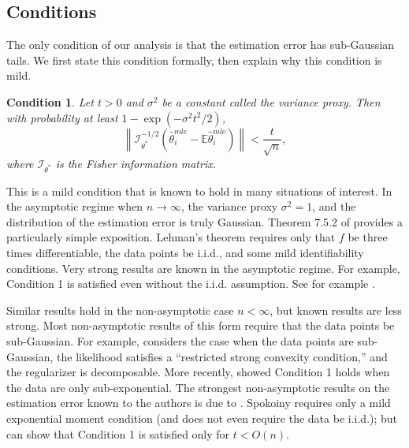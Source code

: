 \documentclass[twoside]{article}
\newtheorem{assumption}{Condition}
\newcommand{\E}{\mathbb{E}}
\newcommand{\w}{\theta}
\newcommand{\wmle}{\hat\w^{mle}}
\newcommand{\wstar}{{\w^{*}}}
\newcommand{\I}{\mathcal I}
\newcommand{\ltwo}[1]{{\lVert {#1} \rVert}}
\newcommand{\ltwobig}[1]{{\left\lVert {#1} \right\rVert}}
\newcommand{\prob}[1]{\Pr\left[{#1}\right]}
\begin{document}
\subsection{Conditions}

The only condition of our analysis is that the estimation error has sub-Gaussian tails.
We first state this condition formally,
then explain why this condition is mild.

\begin{assumption}
Let $t>0$ and $\sigma^2$ be a constant called the \emph{variance proxy}.
Then with probability at least $1-\exp(-\sigma^2t^2/2)$,
\begin{equation}
\ltwobig{\I^{-1/2}_\wstar(\wmle_i-\E\wmle_i)} < \frac{t}{\sqrt n}
,
\end{equation}
where $\I_\wstar$ is the Fisher information matrix.
\end{assumption}

This is a mild condition that is known to hold in many situations of interest.
In the asymptotic regime when $n\to\infty$,
the variance proxy $\sigma^2=1$,
and the distribution of the estimation error is truly Gaussian.
Theorem 7.5.2 of \cite{lehmann1999elements} provides a particularly simple exposition.
Lehman's theorem requires only that $f$ be three times differentiable,
the data points be i.i.d.,
and some mild identifiability conditions.
Very strong results are known in the asymptotic regime.
For example, Condition 1 is satisfied even without the i.i.d. assumption.
See for example \cite{spokoiny2012parametricestimation}.

Similar results hold in the non-asymptotic case $n<\infty$,
but known results are less strong.
Most non-asymptotic results of this form require that the data points be sub-Gaussian.
For example, \cite{negahban2009unified} considers the case when the data points are sub-Gaussian, the likelihood satisfies a ``restricted strong convexity condition,'' and the regularizer is decomposable.
More recently, \cite{sivakumar2015beyond} showed Condition 1 holds when the data are only sub-exponential.
The strongest non-asymptotic results on the estimation error known to the authors is due to \cite{spokoiny2012parametricestimation}.
Spokoiny requires only a mild exponential moment condition (and does not even require the data be i.i.d.);
but can show that Condition 1 is satisfied only for $t < O(n)$.
\end{document}
